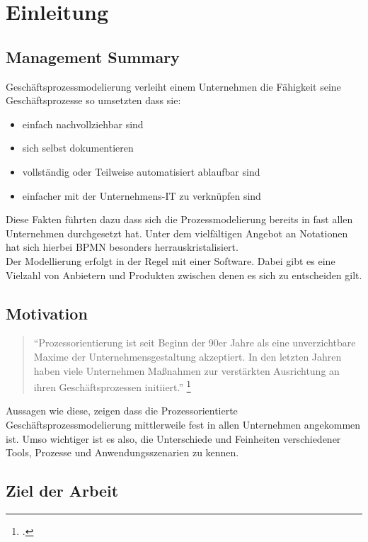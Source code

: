 \section{Einleitung}


\subsection{Management Summary}


Geschäftsprozessmodelierung verleiht einem Unternehmen die Fähigkeit seine
Geschäftsprozesse so umsetzten dass sie:

\begin{itemize}
\item einfach nachvollziehbar sind
\item sich selbst dokumentieren
\item vollständig oder Teilweise automatisiert ablaufbar sind
\item einfacher mit der Unternehmens-IT zu verknüpfen sind
\end{itemize}

Diese Fakten führten dazu dass sich die Prozessmodelierung bereits in fast allen
Unternehmen durchgesetzt hat.
Unter dem vielfältigen Angebot an Notationen hat sich hierbei BPMN besonders
herrauskristalisiert.\\

Der Modellierung erfolgt in der Regel mit einer Software. Dabei gibt es eine
Vielzahl von Anbietern und Produkten zwischen denen es sich zu entscheiden gilt.


\subsection{Motivation}

\begin{quote}
"`Prozessorientierung ist seit Beginn der 90er Jahre als eine unverzichtbare 
Maxime der Unternehmensgestaltung akzeptiert. In den letzten Jahren 
haben viele Unternehmen Maßnahmen
 zur verstärkten Ausrichtung an ihren Geschäftsprozessen initiiert."' 
\footcite[S.182]{prozessmanagement:leitfaden}
\end{quote}


Aussagen wie diese, zeigen dass die Prozessorientierte
Geschäftsprozessmodelierung mittlerweile fest in allen Unternehmen angekommen ist.
Umso wichtiger ist es also, die Unterschiede und Feinheiten verschiedener Tools,
Prozesse und Anwendungsszenarien zu kennen.

\subsection{Ziel der Arbeit}

